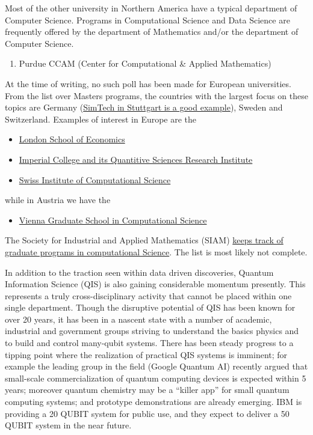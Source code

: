 \documentclass[%
oneside,                 %
final,                   %
10pt]{article}
\begin{document}
\noindent
Most of the other university in Northern America have a typical department of Computer Science. Programs in Computational Science and Data Science are frequently offered by the department of Mathematics and/or the department of Computer Science.
\begin{enumerate}
\item Purdue CCAM (Center for Computational {\&} Applied Mathematics)
\end{enumerate}

\noindent
At the time of writing, no such poll has been made for European universities. From the list over Masters programs, the countries with the largest focus on these topics are Germany (\href{{http://www.simtech.uni-stuttgart.de/}}{SimTech in Stuttgart is a good example}), Sweden and Switzerland. 
Examples of interest in Europe are the 
\begin{itemize}
\item \href{{http://www.lse.ac.uk/seds/}}{London School of Economics}

\item \href{{http://www.imperial.ac.uk/quantitative-sciences-institute/about}}{Imperial College and its Quantitive Sciences Research Institute}

\item \href{{https://www.ics.usi.ch/}}{Swiss Institute of Computational Science}
\end{itemize}

\noindent
while in Austria we have the 
\begin{itemize}
\item \href{{http://www.csc.univie.ac.at/ik/}}{Vienna Graduate School in Computational Science}
\end{itemize}

\noindent
The Society for Industrial and Applied Mathematics (SIAM) \href{{https://www.siam.org/students/resources/cse_programs.php}}{keeps track of graduate programs in computational Science}. The list is most likely not complete. 

In addition to the traction seen within data driven discoveries,
Quantum Information Science (QIS) is also gaining considerable
momentum presently. 
This represents a truly cross-disciplinary activity that cannot be placed within one single
department.
Though the disruptive potential of QIS has been
known for over 20 years, it has been in a nascent state with a number
of academic, industrial and government groups striving to understand
the basics physics and to build and control many-qubit systems.
There has been steady progress to a tipping point where the
realization of practical QIS systems is imminent; for example
the leading group in the field (Google Quantum AI) recently argued
that small-scale commercialization of quantum computing devices is
expected within 5 years; moreover quantum chemistry may be a
“killer app” for small quantum computing systems; and prototype
demonstrations are already emerging.  IBM is providing a 20 QUBIT
system for public use, and they expect to deliver a 50 QUBIT system in
the near future.
\end{document}
